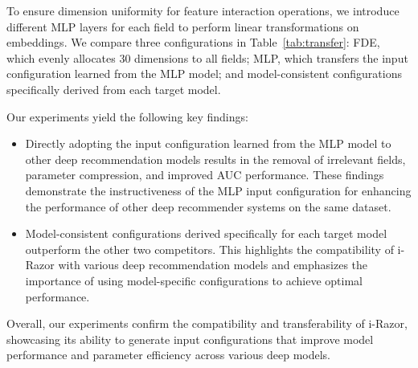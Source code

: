 \documentclass[10pt,journal,compsoc]{IEEEtran}
\begin{document}
  To ensure dimension uniformity for feature interaction operations, we introduce different MLP layers for each field to perform linear transformations on embeddings. We compare three configurations in Table~\ref{tab:transfer}: FDE, which evenly allocates 30 dimensions to all fields; MLP, which transfers the input configuration learned from the MLP model; and model-consistent configurations specifically derived from each target model.

  Our experiments yield the following key findings:
\begin{itemize}
    \item {Directly adopting the input configuration learned from the MLP model to other deep recommendation models results in the removal of irrelevant fields, parameter compression, and improved AUC performance. These findings demonstrate the instructiveness of the MLP input configuration for enhancing the performance of other deep recommender systems on the same dataset.}
    \item {Model-consistent configurations derived specifically for each target model outperform the other two competitors. This highlights the compatibility of i-Razor with various deep recommendation models and emphasizes the importance of using model-specific configurations to achieve optimal performance.}
\end{itemize}

Overall, our experiments confirm the compatibility and transferability of i-Razor, showcasing its ability to generate input configurations that improve model performance and parameter efficiency across various deep models.
\end{document}
